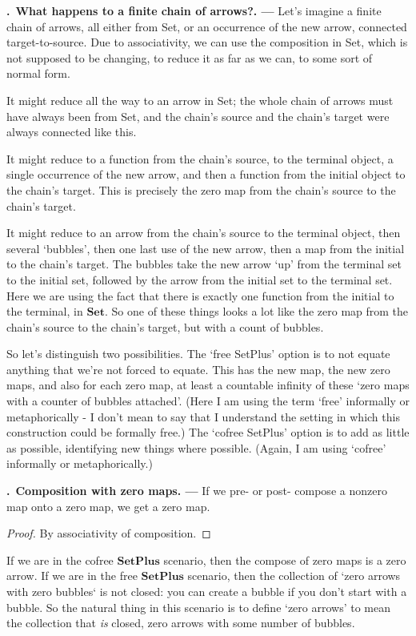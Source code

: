 \documentclass[11pt,noamsfonts]{amsart}
\newcommand{\pointheader}{\vspace{2mm}\noindent\refstepcounter{section}\textbf{\thesection.}}
\newcommand{\tpoint}[1]{\pointheader~{\bf #1. ---}}
\begin{document}
\tpoint{What happens to a finite chain of arrows?}
Let's imagine a finite chain of arrows, all either from Set, or an occurrence of the new arrow, connected target-to-source. Due to associativity, we can use the composition in Set, which is not supposed to be changing, to reduce it as far as we can, to some sort of normal form. 

It might reduce all the way to an arrow in Set; the whole chain of arrows must have always been from Set, and the chain's source and the chain's target were always connected like this.

It might reduce to a function from the chain's source, to the terminal object, a single occurrence of the new arrow, and then a function from the initial object to the chain's target. This is precisely the zero map from the chain's source to the chain's target.

It might reduce to an arrow from the chain's source to the terminal object, then several `bubbles', then one last use of the new arrow, then a map from the initial to the chain's target. The bubbles take the new arrow `up' from the terminal set to the initial set, followed by the arrow from the initial set to the terminal set. Here we are using the fact that there is exactly one function from the initial to the terminal, in \( \mathbf{Set} \).  So one of these things looks a lot like the zero map from the chain's source to the chain's target, but with a count of bubbles. 

So let's distinguish two possibilities. The `free SetPlus' option is to not equate anything that we're not forced to equate. This has the new map, the new zero maps, and also for each zero map, at least a countable infinity of these `zero maps with a counter of bubbles attached'.  (Here I am using the term `free' informally or metaphorically - I don't mean to say that I understand the setting in which this construction could be formally free.)  The `cofree SetPlus' option is to add as little as possible, identifying new things where possible. (Again, I am using `cofree' informally or metaphorically.)

\tpoint{Composition with zero maps}
If we pre- or post- compose a nonzero map onto a zero map, we get a zero map. 

\begin{proof}
By associativity of composition.
\end{proof}

If we are in the cofree \( \mathbf{SetPlus} \) scenario, then the compose of zero maps is a zero arrow. If we are in the free  \( \mathbf{SetPlus} \) scenario, then the collection of `zero arrows with zero bubbles` is not closed: you can create a bubble if you don't start with a bubble. So the natural thing in this scenario is to define `zero arrows' to mean the collection that \emph{is} closed, zero arrows with some number of bubbles. 
\end{document}
